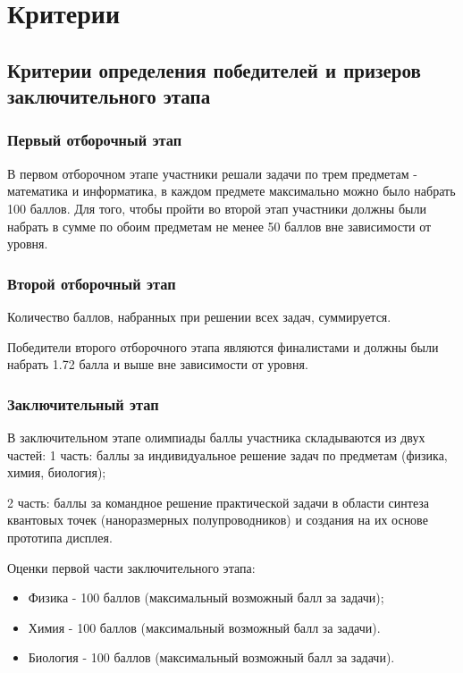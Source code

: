 \part{Критерии}

\chapter{Критерии определения победителей и призеров заключительного этапа}

\section{Первый отборочный этап}
 
В первом отборочном этапе участники решали задачи по трем предметам - математика и информатика, в каждом предмете максимально можно было набрать 100 баллов. Для того, чтобы пройти во второй этап участники должны были набрать в сумме по обоим предметам не менее 50 баллов вне зависимости от уровня.

\section{Второй отборочный этап}

Количество баллов, набранных при решении всех задач, суммируется. 

Победители второго отборочного этапа являются финалистами и должны были набрать 1.72 балла и выше вне зависимости от уровня.

\section{Заключительный этап}

В заключительном этапе олимпиады баллы участника складываются из двух частей: 1 часть: баллы за индивидуальное решение задач по предметам (физика, химия, биология);

2 часть: баллы за командное решение практической задачи в области синтеза квантовых точек (наноразмерных полупроводников) и создания на их основе прототипа дисплея.

Оценки первой части заключительного этапа:
\begin{itemize}
    \item Физика - 100 баллов (максимальный возможный балл за задачи);
    \item Химия - 100 баллов (максимальный возможный балл за задачи).
    \item Биология - 100 баллов (максимальный возможный балл за задачи).
\end{itemize}
 
